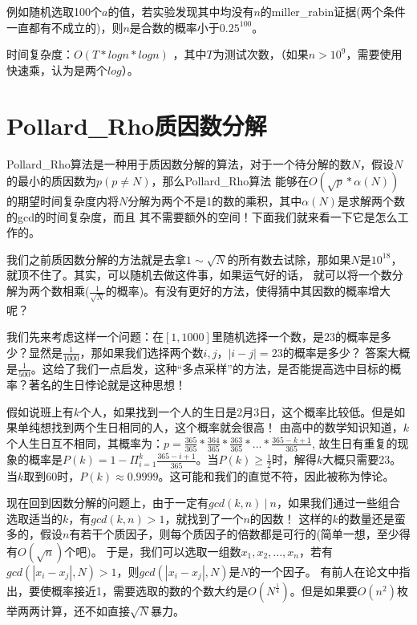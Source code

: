 例如随机选取100个$a$的值，若实验发现其中均没有$n$的miller\_rabin证据(两个条件一直都有不成立的)，则$n$是合数的概率小于$0.25^{100}$。


时间复杂度：$O(T*logn*logn)$ ，其中$T$为测试次数，（如果$n>10^9$，需要使用快速乘，认为是两个$log$）。


\section{Pollard\_Rho质因数分解}

Pollard\_Rho算法是一种用于质因数分解的算法，对于一个待分解的数$N$，假设$N$的最小的质因数为$p(p\neq N)$，那么Pollard\_Rho算法
能够在$O(\sqrt{p}*\alpha(N))$的期望时间复杂度内将$N$分解为两个不是1的数的乘积，其中$\alpha(N)$是求解两个数的gcd的时间复杂度，而且
其不需要额外的空间！下面我们就来看一下它是怎么工作的。

我们之前质因数分解的方法就是去拿$1\sim \sqrt{N}$的所有数去试除，那如果$N$是$10^{18}$，就顶不住了。其实，可以随机去做这件事，如果运气好的话，
就可以将一个数分解为两个数相乘($\frac{1}{\sqrt{N}}$的概率)。有没有更好的方法，使得猜中其因数的概率增大呢？

我们先来考虑这样一个问题：在$[1,1000]$里随机选择一个数，是$23$的概率是多少？显然是$\frac{1}{1000}$，那如果我们选择两个数$i,j$，$|i-j|=23$的概率是多少？
答案大概是$\frac{1}{500}$。这给了我们一点启发，这种“多点采样”的方法，是否能提高选中目标的概率？著名的生日悖论就是这种思想！

假如说班上有$k$个人，如果找到一个人的生日是2月3日，这个概率比较低。但是如果单纯想找到两个生日相同的人，这个概率就会很高！
由高中的数学知识知道，$k$个人生日互不相同，其概率为：$p=\frac{365}{365}*\frac{364}{365}*\frac{363}{365}*...*\frac{365-k+1}{365}$,
故生日有重复的现象的概率是$P(k) = 1 - \Pi_{i=1}^k\frac{365-i+1}{365}$。当$P(k)\ge\frac{1}{2}$时，解得$k$大概只需要23。
当$k$取到$60$时，$P(k)\approx 0.9999$。这可能和我们的直觉不符，因此被称为悖论。

现在回到因数分解的问题上，由于一定有$gcd(k,n)\ |\ n$，如果我们通过一些组合选取适当的$k$，有$gcd(k,n)>1$，就找到了一个$n$的因数！
这样的$k$的数量还是蛮多的，假设$n$有若干个质因子，则每个质因子的倍数都是可行的(简单一想，至少得有$O(\sqrt{n})$个吧)。
于是，我们可以选取一组数$x_1,x_2,...,x_n$，若有$gcd(|x_i-x_j|,N)>1$，则$gcd(|x_i-x_j|,N)$是$N$的一个因子。
有前人在论文中指出，要使概率接近1，需要选取的数的个数大约是$O(N^{\frac{1}{4}})$。但是如果要$O(n^2)$枚举两两计算，还不如直接$\sqrt{N}$暴力。

